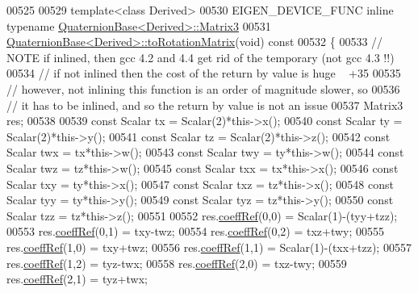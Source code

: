 \begin{DoxyCode}
00525 
00529 \textcolor{keyword}{template}<\textcolor{keyword}{class} Derived>
00530 EIGEN\_DEVICE\_FUNC \textcolor{keyword}{inline} \textcolor{keyword}{typename} \hyperlink{group___core___module_class_eigen_1_1_matrix}{QuaternionBase<Derived>::Matrix3}
00531 \hyperlink{group___geometry___module_a621c71eec9680bf77342b28a473b6874}{QuaternionBase<Derived>::toRotationMatrix}(\textcolor{keywordtype}{void})\textcolor{keyword}{ const}
00532 \textcolor{keyword}{}\{
00533   \textcolor{comment}{// NOTE if inlined, then gcc 4.2 and 4.4 get rid of the temporary (not gcc 4.3 !!)}
00534   \textcolor{comment}{// if not inlined then the cost of the return by value is huge ~ +35%
00535   \textcolor{comment}{// however, not inlining this function is an order of magnitude slower, so}
00536   \textcolor{comment}{// it has to be inlined, and so the return by value is not an issue}
00537   Matrix3 res;
00538 
00539   \textcolor{keyword}{const} Scalar tx  = Scalar(2)*this->x();
00540   \textcolor{keyword}{const} Scalar ty  = Scalar(2)*this->y();
00541   \textcolor{keyword}{const} Scalar tz  = Scalar(2)*this->z();
00542   \textcolor{keyword}{const} Scalar twx = tx*this->w();
00543   \textcolor{keyword}{const} Scalar twy = ty*this->w();
00544   \textcolor{keyword}{const} Scalar twz = tz*this->w();
00545   \textcolor{keyword}{const} Scalar txx = tx*this->x();
00546   \textcolor{keyword}{const} Scalar txy = ty*this->x();
00547   \textcolor{keyword}{const} Scalar txz = tz*this->x();
00548   \textcolor{keyword}{const} Scalar tyy = ty*this->y();
00549   \textcolor{keyword}{const} Scalar tyz = tz*this->y();
00550   \textcolor{keyword}{const} Scalar tzz = tz*this->z();
00551 
00552   res.\hyperlink{class_eigen_1_1_plain_object_base_a25626a55b26a4323565f79d1b7c48ea8}{coeffRef}(0,0) = Scalar(1)-(tyy+tzz);
00553   res.\hyperlink{class_eigen_1_1_plain_object_base_a25626a55b26a4323565f79d1b7c48ea8}{coeffRef}(0,1) = txy-twz;
00554   res.\hyperlink{class_eigen_1_1_plain_object_base_a25626a55b26a4323565f79d1b7c48ea8}{coeffRef}(0,2) = txz+twy;
00555   res.\hyperlink{class_eigen_1_1_plain_object_base_a25626a55b26a4323565f79d1b7c48ea8}{coeffRef}(1,0) = txy+twz;
00556   res.\hyperlink{class_eigen_1_1_plain_object_base_a25626a55b26a4323565f79d1b7c48ea8}{coeffRef}(1,1) = Scalar(1)-(txx+tzz);
00557   res.\hyperlink{class_eigen_1_1_plain_object_base_a25626a55b26a4323565f79d1b7c48ea8}{coeffRef}(1,2) = tyz-twx;
00558   res.\hyperlink{class_eigen_1_1_plain_object_base_a25626a55b26a4323565f79d1b7c48ea8}{coeffRef}(2,0) = txz-twy;
00559   res.\hyperlink{class_eigen_1_1_plain_object_base_a25626a55b26a4323565f79d1b7c48ea8}{coeffRef}(2,1) = tyz+twx;
}
\end{DoxyCode}
